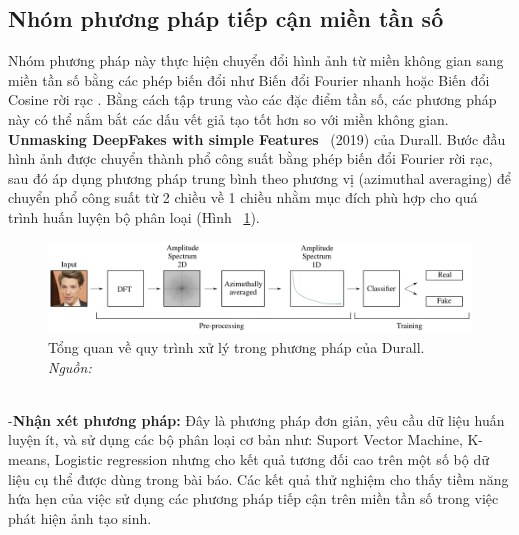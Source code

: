 \subsection{Nhóm phương pháp tiếp cận miền tần số}
Nhóm phương pháp này thực hiện chuyển đổi hình ảnh từ miền không gian sang miền tần số bằng các phép biến đổi như Biến đổi Fourier nhanh \cite{Arunachalam2013TheFF} hoặc Biến đổi Cosine rời rạc \cite{1672377}.
Bằng cách tập trung vào các đặc điểm tần số, các phương pháp này có thể nắm bắt các dấu vết giả tạo tốt hơn so với miền không gian.\\
%
\textbf{Unmasking DeepFakes with simple Features}~\cite{durall2019unmasking} (2019) của Durall.
Bước đầu hình ảnh được chuyển thành phổ công suất bằng phép biến đổi Fourier rời rạc, sau đó áp dụng phương pháp trung bình theo phương vị (azimuthal averaging) để chuyển phổ công suất từ 2 chiều về 1 chiều nhằm mục đích phù hợp cho quá trình huấn luyện bộ phân loại (Hình ~\ref{fig:model-unmasking-deepfakes-1}).
%
\begin{figure}[ht!]
	\centering
	\includegraphics[width=1.0\linewidth]{Images/model-unmasking-deepfakes-1.png}
	\begin{minipage}{0.9\linewidth}
		\caption{Tổng quan về quy trình xử lý trong phương pháp của Durall. \textit{Nguồn: \cite{durall2019unmasking}}}
		\label{fig:model-unmasking-deepfakes-1}
	\end{minipage}
\end{figure}\\
%
%
-\textbf{Nhận xét phương pháp:}
Đây là phương pháp đơn giản, yêu cầu dữ liệu huấn luyện ít, và sử dụng các bộ phân loại cơ bản như: Suport Vector Machine, K-means, Logistic regression nhưng cho kết quả tương đối cao trên một số bộ dữ liệu cụ thể được dùng trong bài báo. Các kết quả thử nghiệm cho thấy tiềm năng hứa hẹn của việc sử dụng các phương pháp tiếp cận trên miền tần số trong việc phát hiện ảnh tạo sinh.\\
%
